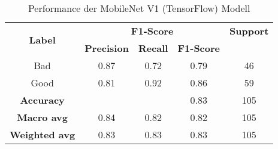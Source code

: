 \begin{table}[H]
\centering
\begin{tabular}{|c|c|c|c|c|}
\hline
\multirow{2}{*}{\textbf{Label}} & \multicolumn{3}{c|}{\textbf{F1-Score}} & \textbf{Support} \\
\cline{2-4}
                               & \textbf{Precision} & \textbf{Recall} & \textbf{F1-Score} & \\
\hline
Bad                           & 0.87 & 0.72 & 0.79 & 46 \\
Good                          & 0.81 & 0.92 & 0.86 & 59 \\
\hline
\textbf{Accuracy}             & & & 0.83 & 105 \\
\hline
\textbf{Macro avg}            & 0.84 & 0.82 & 0.82 & 105 \\
\hline
\textbf{Weighted avg}         & 0.83 & 0.83 & 0.83 & 105 \\
\hline
\end{tabular}
\caption{Performance der MobileNet V1 (TensorFlow) Modell}
\end{table}